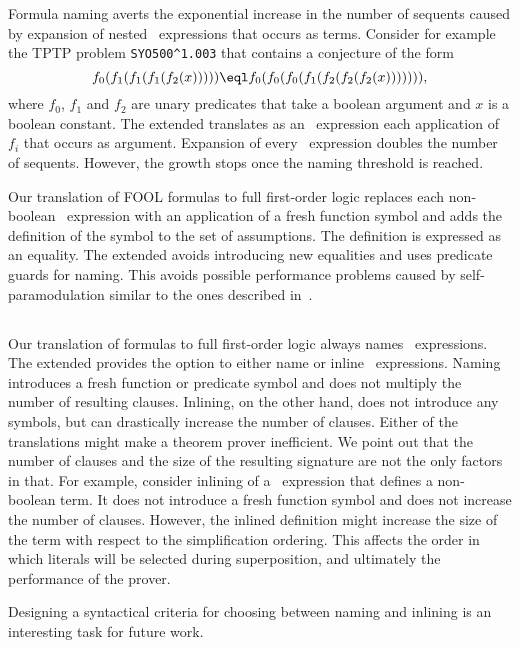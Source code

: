 Formula naming averts the exponential increase in the number of sequents caused by expansion of nested \ITE\ expressions that occurs as terms. Consider for example the TPTP problem \verb'SYO500^1.003' that contains a conjecture of the form $$f_0(f_1(f_1(f_1(f_2(x))))) \eql f_0(f_0(f_0(f_1(f_2(f_2(f_2(x))))))),$$ where $f_0$, $f_1$ and $f_2$ are unary predicates that take a boolean argument and $x$ is a boolean constant. The extended \newcnf{} translates as an \ITE\ expression each application of $f_i$ that occurs as argument. Expansion of every \ITE\ expression doubles the number of sequents. However, the growth stops once the naming threshold is reached.

Our translation of FOOL formulas to full first-order logic replaces each non-boolean \ITE\ expression with an application of a fresh function symbol and adds the definition of the symbol to the set of assumptions. The definition is expressed as an equality. The extended \newcnf{} avoids introducing new equalities and uses predicate guards for naming. This avoids possible performance problems caused by self-paramodulation similar to the ones described in~\cite{FOOL}.

\subsection{\LETIN}
Our translation of \folb{} formulas to full first-order logic always names \LETIN\ expressions. The extended \newcnf{} provides the option to either name or inline \LETIN\ expressions. Naming introduces a fresh function or predicate symbol and does not multiply the number of resulting clauses. Inlining, on the other hand, does not introduce any symbols, but can drastically increase the number of clauses. Either of the translations might make a theorem prover inefficient. We point out that the number of clauses and the size of the resulting signature are not the only factors in that. For example, consider inlining of a \LETIN\ expression that defines a non-boolean term. It does not introduce a fresh function symbol and does not increase the number of clauses. However, the inlined definition might increase the size of the term with respect to the simplification ordering. This affects the order in which literals will be selected during superposition, and ultimately the performance of the prover.

Designing a syntactical criteria for choosing between naming and inlining is an interesting task for future work.